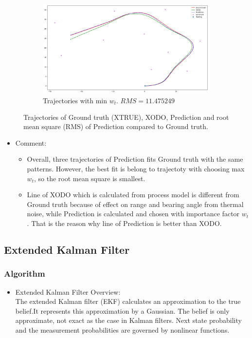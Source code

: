 \documentclass{article}
\begin{document}
\begin{figure}[h!]
\begin{subfigure}[b]{0.8\linewidth}
	\includegraphics[width=\textwidth]{../min.png}
	\caption{Trajectories with min $w_t$. $RMS = 11.475249$}\label{fig:image-3}
\end{subfigure}
\caption{Trajectories of Ground truth (XTRUE), XODO, Prediction and root mean square (RMS) of Prediction compared to Ground truth.}
\end{figure}
\begin{itemize}
	\item{Comment:}
	\begin{itemize}
		\item{Overall, three trajectories of Prediction fits Ground truth with the same patterns. However, the best fit is belong to trajectoty with choosing max $w_t$, so the root mean square is smallest.} 
		\item{Line of XODO which is calculated from process model is different from Ground truth because of effect on range and bearing angle from thermal noise, while Prediction is calculated and chosen with importance factor $w_t$. That is the reason why line of Prediction is better than XODO.}
	\end{itemize}
\end{itemize}


\pagebreak

\subsection{Extended Kalman Filter}
\subsubsection{Algorithm}
\begin{itemize}
	\item{Extended Kalman Filter Overview: }	\\
The extended Kalman filter (EKF) calculates an approximation to the true belief.It
represents this approximation by a Gaussian. The belief is only approximate, not exact as the case in Kalman filters. Next state probability and the measurement probabilities are governed by nonlinear functions.
\end{itemize}
	
\end{document}
